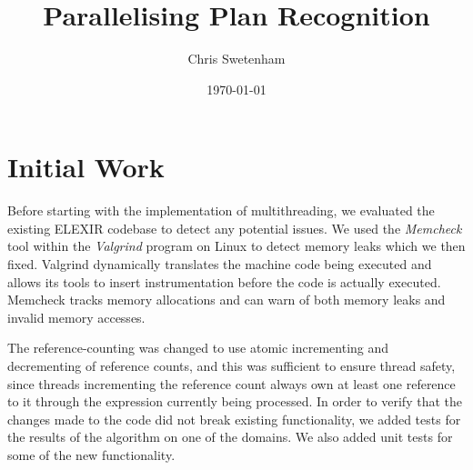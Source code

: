 \documentclass[12pt,twoside,abbrevs,msc,ai,notimes,logo,sansheadings]{infthesis}
\title{Parallelising Plan Recognition}
\author{Chris Swetenham}
\date{\today}
\begin{document}
  \begin{preliminary}
    \maketitle

    
    \standarddeclaration
    \tableofcontents
    \listoffigures
  \end{preliminary}


  
  
  
  
  \chapter{Initial Work}
  Before starting with the implementation of multithreading, we evaluated the existing ELEXIR codebase to detect any potential issues. We used the \emph{Memcheck} tool within the \emph{Valgrind} program on Linux to detect memory leaks which we then fixed. Valgrind dynamically translates the machine code being executed and allows its tools to insert instrumentation before the code is actually executed. Memcheck tracks memory allocations and can warn of both memory leaks and invalid memory accesses.
  
  The reference-counting was changed to use atomic incrementing and decrementing of reference counts, and this was sufficient to ensure thread safety, since threads incrementing the reference count always own at least one reference to it through the expression currently being processed. In order to verify that the changes made to the code did not break existing functionality, we added tests for the results of the algorithm on one of the domains. We also added unit tests for some of the new functionality.
  
\end{document}
